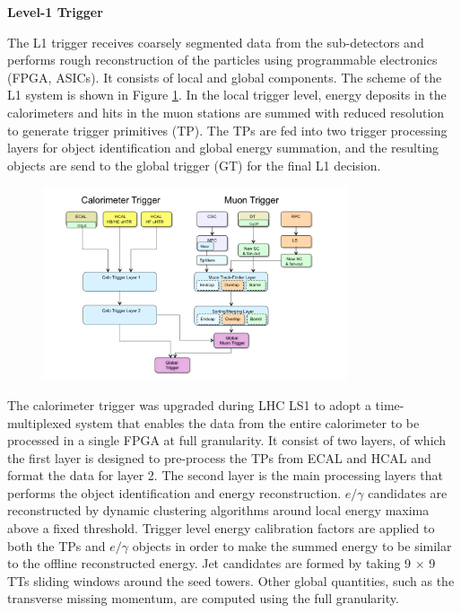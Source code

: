 \documentclass[thesis.tex]{subfiles}
\begin{document}
\noindent \textbf{Level-1 Trigger}

The L1 trigger receives coarsely segmented data from the sub-detectors and performs rough reconstruction of the particles using programmable electronics (FPGA, ASICs).
It consists of local and global components. 
The scheme of the L1 system is shown in Figure \ref{fig:L1}.
In the local trigger level, energy deposits in the calorimeters and hits in the muon stations are summed with reduced resolution to generate trigger primitives (TP). 
The TPs are fed into two trigger processing layers for object identification and global energy summation, and the resulting objects are send to the global trigger (GT) for the final L1 decision.

\begin{figure}[hbtp]
	\centering
	\includegraphics[width=0.8\textwidth]{plot/L1flow.png}
	\label{fig:L1}
\end{figure}


The calorimeter trigger was upgraded during LHC LS1 to adopt a time-multiplexed system that enables the data from the entire calorimeter to be processed in a single FPGA at full granularity.
It consist of two layers, of which the first layer is designed to pre-process the TPs from ECAL and HCAL and format the data for layer 2.
The second layer is the main processing layers that performs the object identification and energy reconstruction. 
$e/\gamma$ candidates are reconstructed by dynamic clustering algorithms around local energy maxima above a fixed threshold. 
Trigger level energy calibration factors are applied to both the TPs and $e/\gamma$ objects in order to make the summed energy to be similar to the offline reconstructed energy. 
Jet candidates are formed by taking 9 $\times$ 9 TTs sliding windows around the seed towers. 
Other global quantities, such as the transverse missing momentum, are computed using the full granularity.
\end{document}
